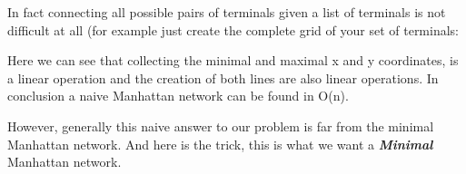 In fact connecting all possible pairs of terminals given a list of terminals is not difficult at all (for example just create the complete grid of your set of terminals: 



Here we can see that collecting the minimal and maximal x and y coordinates, is a linear operation and the creation of both lines are also linear operations. In conclusion a naive Manhattan network can be found in O(n). 

However, generally this naive answer to our problem is far from the minimal Manhattan network. And here is the trick, this is what we want a \textbf{\emph{Minimal}} Manhattan network.
